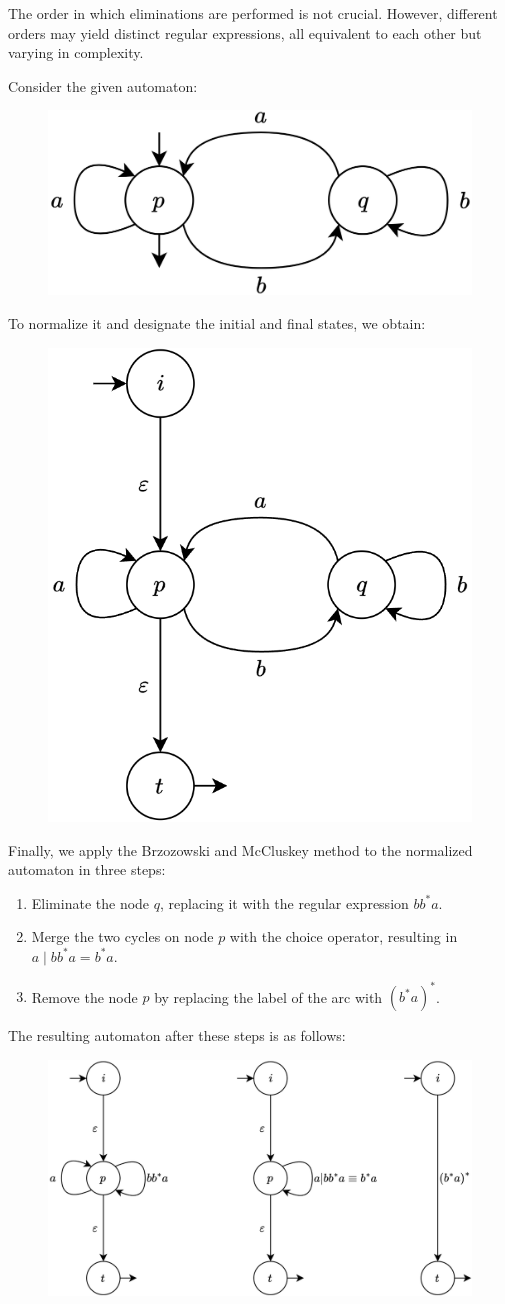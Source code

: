 The order in which eliminations are performed is not crucial. 
However, different orders may yield distinct regular expressions, all equivalent to each other but varying in complexity.
\begin{example}
    Consider the given automaton:
    \begin{figure}[H]
        \centering
        \includegraphics[width=0.35\linewidth]{images/br1.png}
    \end{figure}
    To normalize it and designate the initial and final states, we obtain:
    \begin{figure}[H]
        \centering
        \includegraphics[width=0.35\linewidth]{images/br2.png}
    \end{figure}
    Finally, we apply the Brzozowski and McCluskey method to the normalized automaton in three steps:
    \begin{enumerate}
        \item Eliminate the node $q$, replacing it with the regular expression $bb^{\ast}a$.
        \item Merge the two cycles on node $p$ with the choice operator, resulting in $a\mid bb^{\ast}a=b^{\ast}a$. 
        \item Remove the node $p$ by replacing the label of the arc with $(b^{\ast}a)^{\ast}$. 
    \end{enumerate}
    The resulting automaton after these steps is as follows:
    \begin{figure}[H]
        \centering
        \includegraphics[width=0.65\linewidth]{images/br3.png}
    \end{figure}
\end{example}